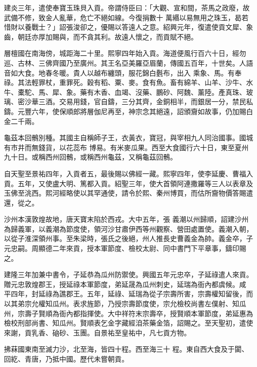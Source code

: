 \begin{pinyinscope}
 建炎三年，遣使奉寶玉珠貝入貢。帝謂侍臣曰：「大觀、宣和間，茶馬之政廢，故武備不修，致金人亂華，危亡不絕如線。今復捐數十
 萬緡以易無用之珠玉，曷若惜財以養戰士？」詔張浚卻之，優賜以答遠人之意。紹興元年，復遣使貢文犀、象齒，朝廷亦厚加賜與，而不貪其利。故遠人懷之，而貢賦不絕。



 層檀國在南海傍，城距海二十里。熙寧四年始入貢。海道便風行百六十日，經勿巡、古林、三佛齊國乃至廣州。其王名亞美羅亞眉蘭，傳國五百年，十世矣。人語音如大食。地春冬暖。貴人以越布纏頭，服花錦白氎布，出入
 乘象、馬。有奉祿。其法輕罪杖，重罪死。穀有稻、粟、麥。食有魚。畜有綿羊、山羊、沙牛、水牛、橐駝、馬、犀、象。藥有木香、血竭、沒藥、鵬砂、阿魏、薰陸。產真珠、玻璃、密沙華三酒。交易用錢，官自鑄，三分其齊，金銅相半，而銀居一分，禁民私鑄。元豐六年，使保順郎將層伽尼再至，神宗念其絕遠，詔頒齎如故事，仍加賜白金二千兩。



 龜茲本回鶻別種。其國主自稱師子王，衣黃衣，寶冠，與宰相九人同治國事。國城有市井而無錢貨，以花蕊布
 博易。有米麥瓜果。西至大食國行六十日，東至夏州九十日。或稱西州回鶻，或稱西州龜茲，又稱龜茲回鶻。



 自天聖至景祐四年，入貢者五，最後賜以佛經一藏。熙寧四年，使李延慶、曹福入貢。五年，又使盧大明、篤都入貢。紹聖三年，使大首領阿連撒羅等三人以表章及玉佛至洮西。熙河經略使以其罕通使，請令於熙、秦州博買，而估所齎物價答賜遣還，從之。



 沙州本漢敦煌故地，唐天寶末陷於西戎。大中五年，張
 義潮以州歸順，詔建沙州為歸義軍，以義潮為節度使，領河沙甘肅伊西等州觀察、營田處置使。義潮入朝，以從子淮深領州事。至朱梁時，張氏之後絕，州人推長史曹義金為帥。義金卒，子元忠嗣。周顯德二年來貢，授本軍節度、檢校太尉、同中書門下平章事，鑄印賜之。



 建隆三年加兼中書令，子延恭為瓜州防禦使。興國五年元忠卒，子延祿遣人來貢。贈元忠敦煌郡王，授延祿本軍節度，弟延晟為瓜州刺史，延瑞為衙內都虞候。咸
 平四年，封延祿為譙郡王。五年，延祿、延瑞為從子宗壽所害，宗壽權知留後，而以其弟宗允權知瓜州。表求旌節，乃授宗壽節度使，宗允檢校尚書左僕射、知瓜州，宗壽子賢順為衙內都指揮使。大中祥符末宗壽卒，授賢順本軍節度，弟延惠為檢校刑部尚書、知瓜州。賢順表乞金字藏經洎茶藥金箔，詔賜之。至天聖初，遣使來謝，貢乳香、硇砂、玉團。自景祐至皇祐中，凡七貢方物。



 拂菻國東南至滅力沙，北至海，皆四十程。西至海三十
 程。東自西大食及于闐、回紇、青唐，乃抵中國。歷代未嘗朝貢。




\end{pinyinscope}
